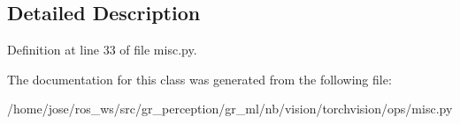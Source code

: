 \subsection{Detailed Description}


Definition at line 33 of file misc.\+py.



The documentation for this class was generated from the following file\+:\begin{DoxyCompactItemize}
\item 
/home/jose/ros\+\_\+ws/src/gr\+\_\+perception/gr\+\_\+ml/nb/vision/torchvision/ops/misc.\+py\end{DoxyCompactItemize}
